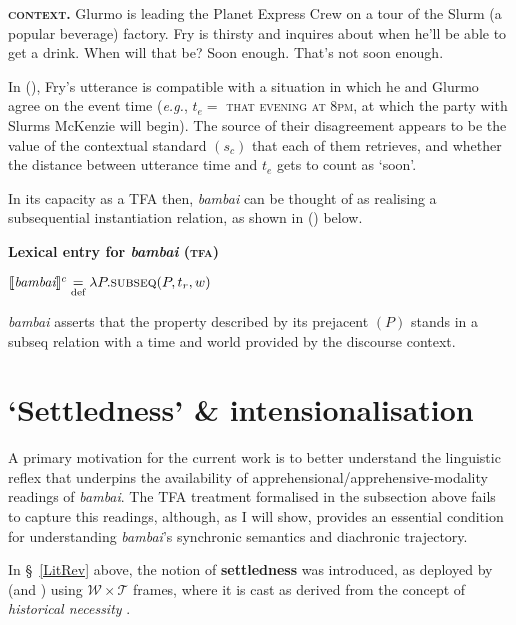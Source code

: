 \pex[labelwidth=3.5em] \textbf{\textsc{context.}} Glurmo is leading the Planet Express Crew on a tour of the Slurm (a popular beverage) factory. Fry is thirsty and inquires about when he'll be able to get a drink.
\a[label=\textbf{Fry}] When will that be?
\a[label=\textbf{Glurmo}] Soon enough.
\a[label=\textbf{Fry}] That's not soon enough.
\xe

In (), Fry's utterance is compatible with a situation in which he and Glurmo agree on the event time (\textit{e.g.}, $ t_e  =$ \textsc{that evening at 8pm}, at which the party with Slurms McKenzie will begin). The source of their disagreement appears to be the value of the contextual standard $ (s_c) $ that each of them retrieves, and whether the distance between utterance time and $ t_e $ gets to count as `soon'.
	
	In its capacity as a TFA then, \textit{bambai} can be thought of as realising a subsequential instantiation relation, as shown in (\nextx) below.
	
\pex \textbf{Lexical entry for \textit{bambai} (\textsc{tfa})}

	$\denote[c]{\textit{bambai}}\underset{\text{def}}{=}\lambda P.\text{{\sc subseq}}(P,t_r,w)$

\textit{bambai} asserts that the property described by its prejacent $ (P) $ stands in a {\sc subseq} relation with a time and world provided by the discourse context.
\xe
	
	
	\section{`Settledness' \& intensionalisation}\label{modSems}
	
A primary motivation for the current work is to better understand the linguistic reflex that underpins the availability of apprehensional/apprehensive-modality readings of \textit{bambai}. The TFA treatment formalised in the subsection above fails to capture this readings, although, as I will show, provides an essential condition for understanding \textit{bambai}'s synchronic semantics and diachronic trajectory.

In §~\ref{LitRev} above, the notion of \textbf{settledness} was introduced, as deployed by \citet{Condoravdi2002} (and \citealp{Kaufmann2005}) using $ \mathcal{W\times T} $ frames, where it is cast as derived from the concept of \textit{historical necessity} \citep{Thomason1970}. 

